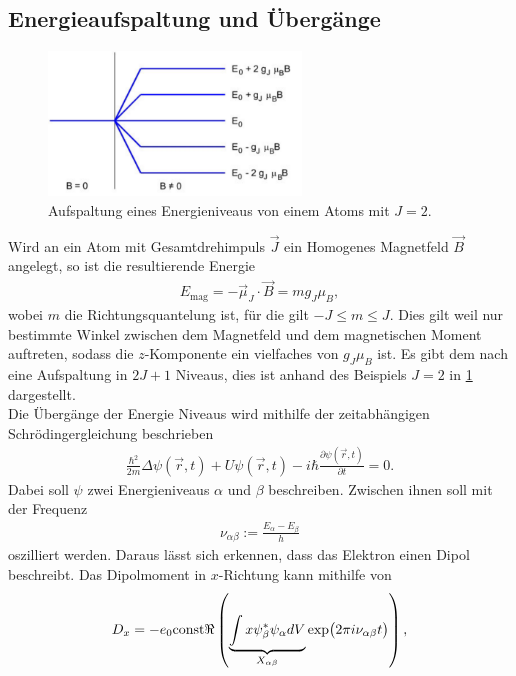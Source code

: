 \subsection{Energieaufspaltung und Übergänge}
\begin{figure}[h!]
	\centering
	\includegraphics[width=0.6\textwidth]{../Grafiken/fig_theo_Aufspaltung.pdf}
	\caption{Aufspaltung eines Energieniveaus von einem Atoms mit $J=2$. \cite{V27}}\label{fig:Theo_Aufspaltung}
\end{figure}
Wird an ein Atom mit Gesamtdrehimpuls $\vec{J}$ ein Homogenes Magnetfeld $\vec{B}$ angelegt, so ist die resultierende Energie 
\begin{align}
	E_\text{mag}= -\vec{\mu}_J\cdot\vec{B}=mg_J\mu_B,
\end{align}
wobei $m$ die Richtungsquantelung ist, für die gilt $-J\le m\le J$.
Dies gilt weil nur bestimmte Winkel zwischen dem Magnetfeld und dem magnetischen Moment auftreten, sodass die $z$-Komponente ein vielfaches von $g_J\mu_B$ ist.
Es gibt dem nach eine Aufspaltung in $2J+1$ Niveaus, dies ist anhand des Beispiels $J=2$ in \ref{fig:Theo_Aufspaltung} dargestellt.\\
Die Übergänge der Energie Niveaus wird mithilfe der zeitabhängigen Schrödingergleichung beschrieben
\begin{align}
	\frac{\hbar^2}{2m}\Delta \psi(\vec{r},t)+U\psi(\vec{r},t)-i\hbar\frac{\partial \psi(\vec{r},t)}{\partial t}=0.
\end{align}
Dabei soll $\psi$ zwei Energieniveaus $\alpha$ und $\beta$ beschreiben.
Zwischen ihnen soll mit der Frequenz 
\begin{align}
	\nu_{\alpha\beta}:=\frac{E_\alpha-E_\beta}{h}
\end{align}
oszilliert werden.
Daraus lässt sich erkennen, dass das Elektron einen Dipol beschreibt. 
Das Dipolmoment in $x$-Richtung kann mithilfe von
\begin{align}
	D_x=-e_0\text{const}\real\left( \underbrace{\int x\psi^*_\beta\psi_\alpha dV}_{X_{\alpha\beta}}\exp(2\pi i\nu_{\alpha\beta}t) \right),
\end{align}

